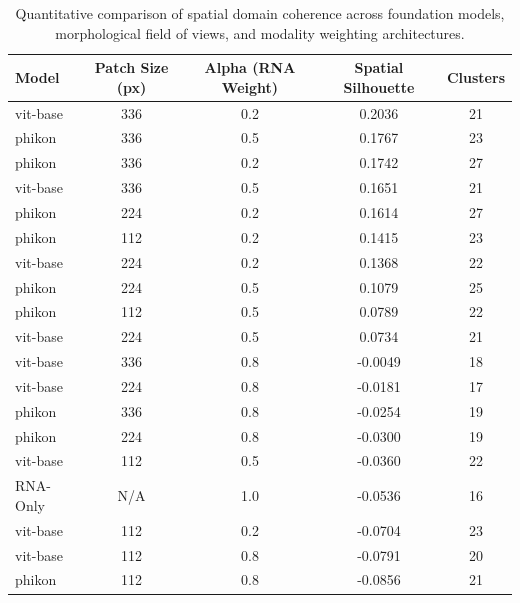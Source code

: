 \begin{table}[h!]
\centering
\begin{tabular}{l c c c c}
\hline
\textbf{Model} & \textbf{Patch Size (px)} & \textbf{Alpha (RNA Weight)} & \textbf{Spatial Silhouette} & \textbf{Clusters} \\\hline
vit-base & 336 & 0.2 & 0.2036 & 21 \\
phikon & 336 & 0.5 & 0.1767 & 23 \\
phikon & 336 & 0.2 & 0.1742 & 27 \\
vit-base & 336 & 0.5 & 0.1651 & 21 \\
phikon & 224 & 0.2 & 0.1614 & 27 \\
phikon & 112 & 0.2 & 0.1415 & 23 \\
vit-base & 224 & 0.2 & 0.1368 & 22 \\
phikon & 224 & 0.5 & 0.1079 & 25 \\
phikon & 112 & 0.5 & 0.0789 & 22 \\
vit-base & 224 & 0.5 & 0.0734 & 21 \\
vit-base & 336 & 0.8 & -0.0049 & 18 \\
vit-base & 224 & 0.8 & -0.0181 & 17 \\
phikon & 336 & 0.8 & -0.0254 & 19 \\
phikon & 224 & 0.8 & -0.0300 & 19 \\
vit-base & 112 & 0.5 & -0.0360 & 22 \\
RNA-Only & N/A & 1.0 & -0.0536 & 16 \\
vit-base & 112 & 0.2 & -0.0704 & 23 \\
vit-base & 112 & 0.8 & -0.0791 & 20 \\
phikon & 112 & 0.8 & -0.0856 & 21 \\
\hline
\end{tabular}
\caption{Quantitative comparison of spatial domain coherence across foundation models, morphological field of views, and modality weighting architectures.}
\label{tab:benchmark_results}
\end{table}
